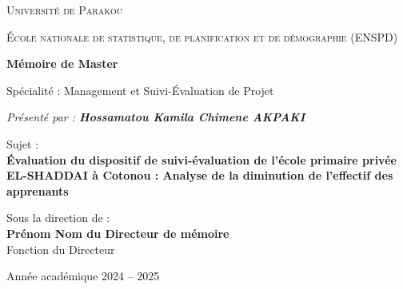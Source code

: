 \documentclass[a4paper,12pt]{report}
\begin{document}
\begin{titlepage}
    {\scshape\LARGE Université de Parakou \par}
    \vspace{0.5cm}
    {\scshape\Large École nationale de statistique, de planification et de démographie (ENSPD)\par}
    \vspace{1.5cm}
    {\huge\bfseries Mémoire de Master \par}
    \vspace{0.5cm}
    {\Large Spécialité : Management et Suivi-Évaluation de Projet\par}
    \vspace{1.5cm}
    {\Large\itshape Présenté par : \textbf{Hossamatou Kamila Chimene AKPAKI}\par}
    \vspace{0.5cm}
    {\Large Sujet : \\
    \textbf{Évaluation du dispositif de suivi-évaluation de l'école primaire privée EL-SHADDAI à Cotonou : Analyse de la diminution de l'effectif des apprenants}\par}
    \vspace{2cm}
    {\Large Sous la direction de : \\
    \textbf{Prénom Nom du Directeur de mémoire} \\
    Fonction du Directeur\par}
    \vfill
    {\Large Année académique 2024 -- 2025\par}
\end{titlepage}
\end{document}
